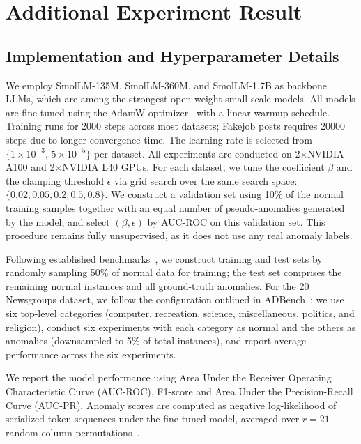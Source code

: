  
\section{Additional Experiment Result}

\subsection{Implementation and Hyperparameter Details}
\label{sec:app:implementation}

We employ SmolLM-135M, SmolLM-360M, and SmolLM-1.7B as backbone LLMs, which are among the strongest open-weight small-scale models. All models are fine-tuned using the AdamW optimizer~\citep{loshchilov2019adamw} with a linear warmup schedule. Training runs for 2000 steps across most datasets; Fakejob posts requires 20000 steps due to longer convergence time. The learning rate is selected from $\{1\times10^{-3},\,5\times10^{-5}\}$ per dataset. All experiments are conducted on 2$\times$NVIDIA A100 and 2$\times$NVIDIA L40 GPUs. For each dataset, we tune the coefficient $\beta$ and the clamping threshold $\epsilon$ via grid search over the same search space: $\{0.02, 0.05, 0.2, 0.5, 0.8\}$. We construct a validation set using 10\% of the normal training samples together with an equal number of pseudo-anomalies generated by the model, and select $(\beta,\epsilon)$ by AUC-ROC on this validation set. This procedure remains fully unsupervised, as it does not use any real anomaly labels.

Following established benchmarks~\cite{shenkar2022anomaly, xu2023fascinating}, we construct training and test sets by randomly sampling 50\% of normal data for training; the test set comprises the remaining normal instances and all ground-truth anomalies. For the 20 Newsgroups dataset, we follow the configuration outlined in ADBench~\cite{han2022adbench}: we use six top-level categories (computer, recreation, science, miscellaneous, politics, and religion), conduct six experiments with each category as normal and the others as anomalies (downsampled to 5\% of total instances), and report average performance across the six experiments.

We report the model performance using Area Under the Receiver Operating Characteristic Curve (AUC-ROC), F1-score and Area Under the Precision-Recall Curve (AUC-PR). Anomaly scores are computed as negative log-likelihood of serialized token sequences under the fine-tuned model, averaged over $r=21$ random column permutations~\cite{tsai2025anollm}.

